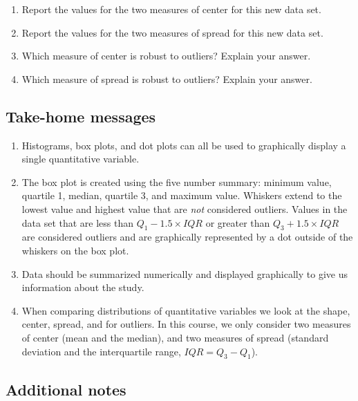 \documentclass[
]{report}
\begin{document}
\begin{enumerate}
\def\labelenumi{\arabic{enumi}.}
\setcounter{enumi}{6}
\item
  Report the values for the two measures of center for this new data set.
  \vspace{0.5in}
\item
  Report the values for the two measures of spread for this new data set.
  \vspace{0.5in}
\item
  Which measure of center is robust to outliers? Explain your answer.
  \vspace{0.8in}
\item
  Which measure of spread is robust to outliers? Explain your answer.
  \vspace{0.8in}
\end{enumerate}

\subsection{Take-home messages}\label{take-home-messages-9}

\begin{enumerate}
\def\labelenumi{\arabic{enumi}.}
\item
  Histograms, box plots, and dot plots can all be used to graphically display a single quantitative variable.
\item
  The box plot is created using the five number summary: minimum value, quartile 1, median, quartile 3, and maximum value. Whiskers extend to the lowest value and highest value that are \emph{not} considered outliers. Values in the data set that are less than \(Q_1 - 1.5\times IQR\) or greater than \(Q_3 + 1.5\times IQR\) are considered outliers and are graphically represented by a dot outside of the whiskers on the box plot.
\item
  Data should be summarized numerically and displayed graphically to give us information about the study.
\item
  When comparing distributions of quantitative variables we look at the shape, center, spread, and for outliers. In this course, we only consider two measures of center (mean and the median), and two measures of spread (standard deviation and the interquartile range, \(IQR = Q_3 - Q_1\)).
\end{enumerate}

\subsection{Additional notes}\label{additional-notes-9}
\end{document}
